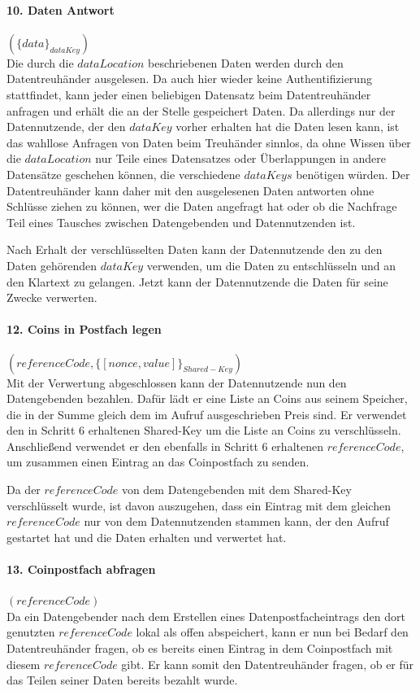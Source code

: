 \documentclass[
	fontsize=12pt,
	headings=small,
	parskip=half,           %
	bibliography=totoc,
	numbers=noenddot,       %
	open=any,               %
]{scrreprt}
\begin{document}
\paragraph{10. Daten Antwort} $(\{data\}_{dataKey})$\\
Die durch die $dataLocation$ beschriebenen Daten werden durch den Datentreuhänder ausgelesen. Da auch hier wieder keine Authentifizierung stattfindet, kann jeder einen beliebigen Datensatz beim Datentreuhänder anfragen und erhält die an der Stelle gespeichert Daten. Da allerdings nur der Datennutzende, der den $dataKey$ vorher erhalten hat die Daten lesen kann, ist das wahllose Anfragen von Daten beim Treuhänder sinnlos, da ohne Wissen über die $dataLocation$ nur Teile eines Datensatzes oder Überlappungen in andere Datensätze geschehen können, die verschiedene $dataKeys$ benötigen würden. Der Datentreuhänder kann daher mit den ausgelesenen Daten antworten ohne Schlüsse ziehen zu können, wer die Daten angefragt hat oder ob die Nachfrage Teil eines Tausches zwischen Datengebenden und Datennutzenden ist.

Nach Erhalt der verschlüsselten Daten kann der Datennutzende den zu den Daten gehörenden $dataKey$ verwenden, um die Daten zu entschlüsseln und an den Klartext zu gelangen. Jetzt kann der Datennutzende die Daten für seine Zwecke verwerten.

\paragraph{12. Coins in Postfach legen} $(referenceCode, \{[nonce,value]\}_{Shared-Key})$\\
\label{para:payment_9}
Mit der Verwertung abgeschlossen kann der Datennutzende nun den Datengebenden bezahlen. Dafür lädt er eine Liste an Coins aus seinem Speicher, die in der Summe gleich dem im Aufruf ausgeschrieben Preis sind. Er verwendet den in Schritt 6 erhaltenen Shared-Key um die Liste an Coins zu verschlüsseln. Anschließend verwendet er den ebenfalls in Schritt 6 erhaltenen $referenceCode$, um zusammen einen Eintrag an das Coinpostfach zu senden.

Da der $referenceCode$ von dem Datengebenden mit dem Shared-Key verschlüsselt wurde, ist davon auszugehen, dass ein Eintrag mit dem gleichen $referenceCode$ nur von dem Datennutzenden stammen kann, der den Aufruf gestartet hat und die Daten erhalten und verwertet hat.

\paragraph{13. Coinpostfach abfragen} $(referenceCode)$\\
Da ein Datengebender nach dem Erstellen eines Datenpostfacheintrags den dort genutzten $referenceCode$ lokal als offen abspeichert, kann er nun bei Bedarf den Datentreuhänder fragen, ob es bereits einen Eintrag in dem Coinpostfach mit diesem $referenceCode$ gibt. Er kann somit den Datentreuhänder fragen, ob er für das Teilen seiner Daten bereits bezahlt wurde.
\end{document}
